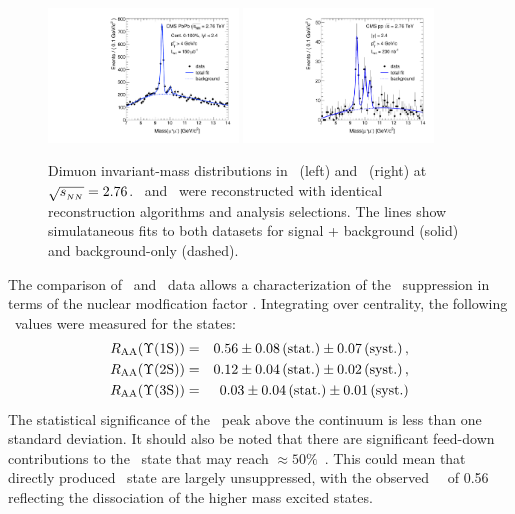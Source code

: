 \begin{figure}[t]
\begin{center}
    \includegraphics[width=0.45\textwidth]{qqbarfigures/hiFitPt4Erf}
    \includegraphics[width=0.45\textwidth]{qqbarfigures/ppFitPt4Erf}
    \caption{Dimuon invariant-mass distributions in \PbPb\ (left) and \pp\ (right)
at $\sqrt{s_{_{NN}}} = 2.76$\TeV. \PbPb\ and \pp\ were reconstructed with identical 
reconstruction algorithms and analysis selections. The lines show simulataneous fits to both 
datasets for signal + background (solid) and background-only (dashed).}
\label{fig:GR:mass}
\end{center}
\end{figure}

The comparison of \pp\ and \PbPb\ data allows a characterization of the \PgU\ suppression
in terms of the nuclear modfication factor \Raa.
Integrating over centrality, the following \Raa\ values were measured for the \PgUn states:
\begin{eqnarray}
R_\mathrm{AA} (\Upsilon\mathrm{(1S)}) &=& 0.56 \pm 0.08\,\mbox{(stat.)} \pm 0.07\,\mbox{(syst.)} \,, \\
R_\mathrm{AA} (\Upsilon\mathrm{(2S)}) &=& 0.12 \pm 0.04\,\mbox{(stat.)} \pm 0.02\,\mbox{(syst.)} \,, \nonumber \\
R_\mathrm{AA} (\Upsilon\mathrm{(3S)}) &=& 0.03 \pm 0.04\,\mbox{(stat.)} \pm 0.01\,\mbox{(syst.)}  \nonumber\\
\end{eqnarray}
The statistical significance of the \PgUc\ peak above the continuum is less than one standard deviation.
It should also be noted that there are significant feed-down contributions to 
the \PgUa\ state that may reach $\approx 50\%$~\cite{Affolder:1999wm, Aaij:2012se}.
This could mean that directly produced \PgUa\ state are largely unsuppressed, with
the observed \PgUa\ \Raa\ of 0.56 reflecting the dissociation of the higher mass excited states.


